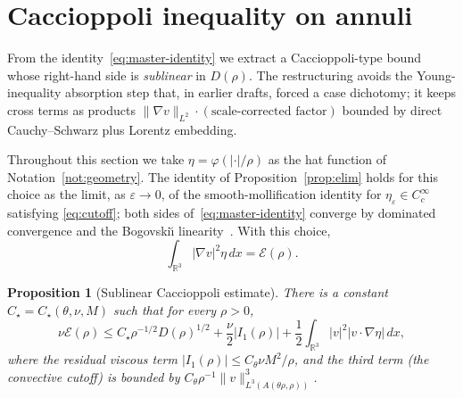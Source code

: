 \documentclass[11pt]{amsart}
\newtheorem{proposition}[theorem]{Proposition}
\theoremstyle{definition}
\newcommand{\RR}{\mathbb{R}}
\newcommand{\EE}{\mathcal{E}}    %
\newcommand{\DD}{D}              %
\newcommand{\norm}[1]{\|#1\|}
\newcommand{\abs}[1]{|#1|}
\begin{document}
\section{Caccioppoli inequality on annuli}\label{sec:caccioppoli}

From the identity~\eqref{eq:master-identity} we extract a
Caccioppoli-type bound whose right-hand side is \emph{sublinear}
in $\DD(\rho)$. The restructuring avoids the Young-inequality
absorption step that, in earlier drafts, forced a case
dichotomy; it keeps cross terms as products
$\norm{\nabla v}_{L^2} \cdot (\text{scale-corrected factor})$
bounded by direct Cauchy--Schwarz plus Lorentz embedding.

Throughout this section we take
$\eta = \varphi(\abs{\cdot}/\rho)$ as the hat function of
Notation~\ref{not:geometry}. The identity
of Proposition~\ref{prop:elim} holds for this choice as the
limit, as $\varepsilon \to 0$, of the smooth-mollification
identity for $\eta_\varepsilon \in C^\infty_c$ satisfying
\eqref{eq:cutoff}; both sides of~\eqref{eq:master-identity}
converge by dominated convergence and the Bogovski\u{\i}
linearity~\cite[III.3.1]{Galdi}. With this choice,
\[
\int_{\RR^3} \abs{\nabla v}^2 \eta\, dx = \EE(\rho).
\]

\begin{proposition}[Sublinear Caccioppoli estimate]
\label{prop:caccioppoli}
There is a constant $C_\star = C_\star(\theta, \nu, M)$ such that
for every $\rho > 0$,
\begin{equation}\label{eq:cacc-full}
\nu \EE(\rho) \leq C_\star \rho^{-1/2} \DD(\rho)^{1/2}
+ \frac{\nu}{2}\abs{I_1(\rho)}
+ \frac{1}{2}\int_{\RR^3} \abs{v}^2 \abs{v\cdot\nabla\eta}\, dx,
\end{equation}
where the residual viscous term
$\abs{I_1(\rho)} \leq C_\theta \nu M^2 / \rho$, and the third
term (the convective cutoff) is bounded by
$C_\theta \rho^{-1} \norm{v}_{L^3(A(\theta\rho, \rho))}^3$.
\end{proposition}
\end{document}
